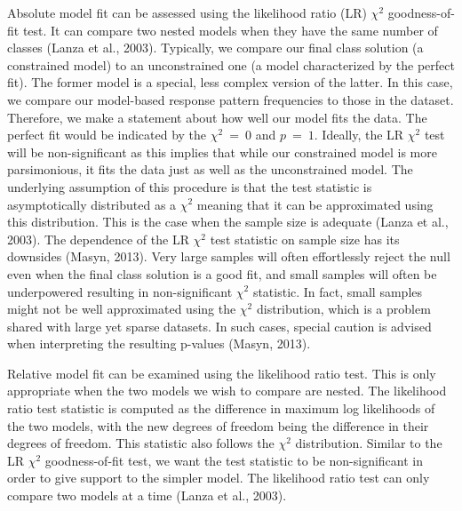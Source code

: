 \documentclass[
  ,man]{apa6}
\begin{document}
Absolute model fit can be assessed using the likelihood ratio (LR) \(\chi^2\) goodness-of-fit test.
It can compare two nested models when they have the same number of classes (Lanza et al., 2003).
Typically, we compare our final class solution (a constrained model)
to an unconstrained one (a model characterized by the perfect fit).
The former model is a special, less complex version of the latter.
In this case, we compare our model-based response pattern frequencies to those in the dataset.
Therefore, we make a statement about how well our model fits the data.
The perfect fit would be indicated by the \(\chi^2\ =\ 0\) and \(p\ =\ 1\).
Ideally, the LR \(\chi^2\) test will be non-significant as this implies
that while our constrained model is more parsimonious, it fits the data just as well as the unconstrained model.
The underlying assumption of this procedure is that the test statistic is asymptotically distributed
as a \(\chi^2\) meaning that it can be approximated using this distribution.
This is the case when the sample size is adequate (Lanza et al., 2003).
The dependence of the LR \(\chi^2\) test statistic on sample size has its downsides (Masyn, 2013).
Very large samples will often effortlessly reject the null even when the final class solution is a good fit,
and small samples will often be underpowered resulting in non-significant \(\chi^2\) statistic.
In fact, small samples might not be well approximated using the \(\chi^2\) distribution,
which is a problem shared with large yet sparse datasets.
In such cases, special caution is advised when interpreting the resulting p-values (Masyn, 2013).

Relative model fit can be examined using the likelihood ratio test.
This is only appropriate when the two models we wish to compare are nested.
The likelihood ratio test statistic is computed as the difference in maximum log likelihoods of the two models,
with the new degrees of freedom being the difference in their degrees of freedom.
This statistic also follows the \(\chi^2\) distribution.
Similar to the LR \(\chi^2\) goodness-of-fit test, we want the test statistic to be non-significant
in order to give support to the simpler model.
The likelihood ratio test can only compare two models at a time (Lanza et al., 2003).
\end{document}
